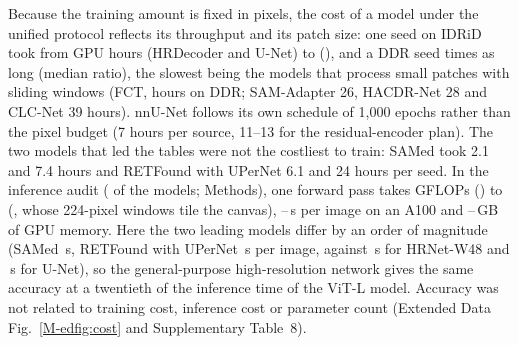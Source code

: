 Because the training amount is fixed in pixels, the cost of a model under the unified protocol reflects its throughput and its patch size: one seed on IDRiD took from  GPU hours (HRDecoder and U-Net) to  (), and a DDR seed  times as long (median ratio), the slowest being the models that process small patches with sliding windows (FCT,  hours on DDR; SAM-Adapter 26, HACDR-Net 28 and CLC-Net 39 hours). nnU-Net follows its own schedule of 1,000 epochs rather than the pixel budget (7 hours per source, 11--13 for the residual-encoder plan). The two models that led the tables were not the costliest to train: SAMed took 2.1 and 7.4 hours and RETFound with UPerNet 6.1 and 24 hours per seed. In the inference audit ( of the  models; Methods), one forward pass takes  GFLOPs () to  (, whose 224-pixel windows tile the canvas), --\,s per image on an A100 and --\,GB of GPU memory. Here the two leading models differ by an order of magnitude (SAMed \,s, RETFound with UPerNet \,s per image, against \,s for HRNet-W48 and \,s for U-Net), so the general-purpose high-resolution network gives the same accuracy at a twentieth of the inference time of the ViT-L model. Accuracy was not related to training cost, inference cost or parameter count (Extended Data Fig.~\ref{M-edfig:cost} and Supplementary Table~8).
